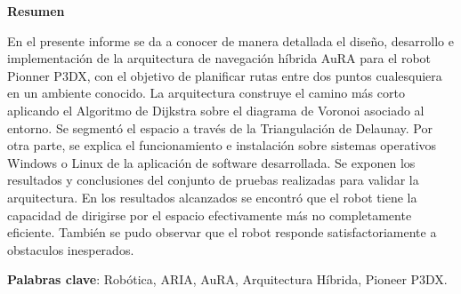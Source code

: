 \documentclass[11pt,twoside,A5]{article}
\begin{document}
\maketitle 
\fancyhead{} 
\fancyfoot{}
\fancyfoot[RO,LE]{\thepage}

\begin{center}
{\bf\small Resumen}

\vspace{-3mm} \hspace{.05in}\parbox{4.5in} {{\small %

En el presente informe se da a conocer de manera detallada el diseño, desarrollo e implementación 
de la arquitectura de navegación híbrida AuRA para el robot Pionner P3DX, 
con el objetivo de planificar rutas entre dos puntos cualesquiera en un ambiente conocido.
La arquitectura construye el camino más corto aplicando el Algoritmo de Dijkstra sobre el diagrama de Voronoi asociado
al entorno. Se segmentó el espacio a través de la Triangulación de Delaunay.
Por otra parte, se explica el funcionamiento e instalación sobre sistemas operativos Windows o Linux de la aplicación de software 
desarrollada. Se exponen los resultados y conclusiones del conjunto de pruebas 
realizadas para validar la arquitectura. En los resultados alcanzados se encontró 
que el robot tiene la capacidad de dirigirse por el espacio efectivamente más no completamente eficiente. 
También se pudo observar que el robot responde satisfactoriamente a obstaculos inesperados. 

 \textbf{Palabras clave}: Robótica, ARIA, AuRA, Arquitectura Híbrida, Pioneer P3DX.}}
\end{center}
\pagebreak
\end{document}
